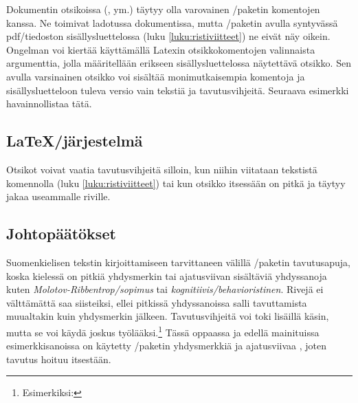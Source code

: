 

Dokumentin otsikoissa (,  ym.)
täytyy olla varovainen \-/paketin komentojen kanssa. Ne
toimivat ladotussa dokumentissa, mutta \-/paketin
avulla syntyvässä pdf\-/tiedoston sisällysluettelossa (luku
\ref{luku:ristiviitteet}) ne eivät näy oikein. Ongelman voi kiertää
käyttämällä Latexin otsikkokomentojen valinnaista argumenttia, jolla
määritellään erikseen sisällysluettelossa näytettävä otsikko. Sen avulla
varsinainen otsikko voi sisältää monimutkaisempia komentoja ja
sisällysluetteloon tuleva versio vain tekstiä ja tavutusvihjeitä.
Seuraava esimerkki havainnollistaa tätä.

\begin{koodilohkosis}
  \section[Latex-jär\-jes\-tel\-mä]{\LaTeX\-/järjestelmä}
\end{koodilohkosis}

Otsikot voivat vaatia tavutusvihjeitä silloin, kun niihin viitataan
tekstistä komennolla  (luku
\ref{luku:ristiviitteet}) tai kun otsikko itsessään on pitkä ja täytyy
jakaa useammalle riville.

\subsection{Johtopäätökset}
\label{luku:tavutus-johtopäätökset}

Suomenkielisen tekstin kirjoittamiseen tarvittaneen välillä
\-/paketin tavutus\-apuja, koska kielessä on pitkiä
yhdysmerkin tai ajatusviivan sisältäviä yhdyssanoja kuten
\emph{Molotov\--Ribben\-trop\-/sopimus} tai
\emph{kognitiivis\-/behavioristinen}. Rivejä ei välttämättä saa
siisteiksi, ellei pitkissä yhdyssanoissa salli tavuttamista muualtakin
kuin yhdysmerkin jälkeen. Tavutusvihjeitä voi toki lisäillä käsin, mutta
se voi käydä joskus työlääksi.\footnote{Esimerkiksi:
  } Tässä oppaassa ja
edellä mainituissa esimerkkisanoissa on käytetty
\-/paketin yhdysmerkkiä \koodi{\keno -/} ja
ajatusviivaa \koodi{\keno --}, joten tavutus hoituu itsestään.

